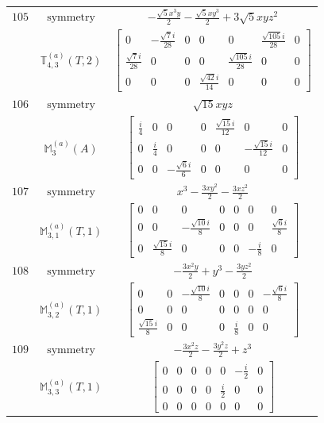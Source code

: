\documentclass[fleqn,8pt,landscape]{jsarticle}
\begin{document}
\begin{longtable}{ccc}
$ 105 $ & $ \text{symmetry} $ & $ - \frac{\sqrt{5} x^{3} y}{2} - \frac{\sqrt{5} x y^{3}}{2} + 3 \sqrt{5} x y z^{2} $ \\
$  $ & $ \mathbb{T}_{4,3}^{(a)}(T,2) $ & $ \begin{bmatrix} 0 & - \frac{\sqrt{7} i}{28} & 0 & 0 & 0 & \frac{\sqrt{105} i}{28} & 0 \\ \frac{\sqrt{7} i}{28} & 0 & 0 & 0 & \frac{\sqrt{105} i}{28} & 0 & 0 \\ 0 & 0 & 0 & \frac{\sqrt{42} i}{14} & 0 & 0 & 0 \end{bmatrix} $ \\ \hline
$ 106 $ & $ \text{symmetry} $ & $ \sqrt{15} x y z $ \\
$  $ & $ \mathbb{M}_{3}^{(a)}(A) $ & $ \begin{bmatrix} \frac{i}{4} & 0 & 0 & 0 & \frac{\sqrt{15} i}{12} & 0 & 0 \\ 0 & \frac{i}{4} & 0 & 0 & 0 & - \frac{\sqrt{15} i}{12} & 0 \\ 0 & 0 & - \frac{\sqrt{6} i}{6} & 0 & 0 & 0 & 0 \end{bmatrix} $ \\ \hline
$ 107 $ & $ \text{symmetry} $ & $ x^{3} - \frac{3 x y^{2}}{2} - \frac{3 x z^{2}}{2} $ \\
$  $ & $ \mathbb{M}_{3,1}^{(a)}(T,1) $ & $ \begin{bmatrix} 0 & 0 & 0 & 0 & 0 & 0 & 0 \\ 0 & 0 & - \frac{\sqrt{10} i}{8} & 0 & 0 & 0 & \frac{\sqrt{6} i}{8} \\ 0 & \frac{\sqrt{15} i}{8} & 0 & 0 & 0 & - \frac{i}{8} & 0 \end{bmatrix} $ \\ \hline
$ 108 $ & $ \text{symmetry} $ & $ - \frac{3 x^{2} y}{2} + y^{3} - \frac{3 y z^{2}}{2} $ \\
$  $ & $ \mathbb{M}_{3,2}^{(a)}(T,1) $ & $ \begin{bmatrix} 0 & 0 & - \frac{\sqrt{10} i}{8} & 0 & 0 & 0 & - \frac{\sqrt{6} i}{8} \\ 0 & 0 & 0 & 0 & 0 & 0 & 0 \\ \frac{\sqrt{15} i}{8} & 0 & 0 & 0 & \frac{i}{8} & 0 & 0 \end{bmatrix} $ \\ \hline
$ 109 $ & $ \text{symmetry} $ & $ - \frac{3 x^{2} z}{2} - \frac{3 y^{2} z}{2} + z^{3} $ \\
$  $ & $ \mathbb{M}_{3,3}^{(a)}(T,1) $ & $ \begin{bmatrix} 0 & 0 & 0 & 0 & 0 & - \frac{i}{2} & 0 \\ 0 & 0 & 0 & 0 & \frac{i}{2} & 0 & 0 \\ 0 & 0 & 0 & 0 & 0 & 0 & 0 \end{bmatrix} $ \\ \hline

\end{longtable}
\end{document}
